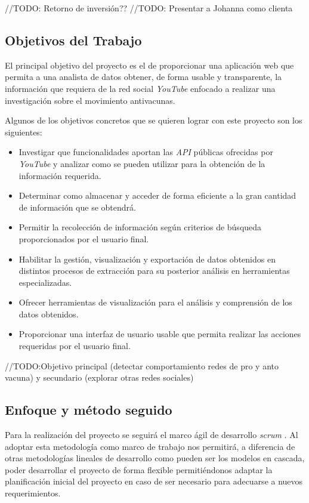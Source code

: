 \documentclass[11pt,a4paper]{article}
\begin{document}
//TODO: Retorno de inversión??
//TODO: Presentar a Johanna como clienta

\subsection{Objetivos del Trabajo}
El principal objetivo del proyecto es el de proporcionar una aplicación web que permita a una analista de datos obtener, de forma usable y transparente, la información que requiera de la red social \textit{YouTube} enfocado a realizar una investigación sobre el movimiento antivacunas.

Algunos de los objetivos concretos que se quieren lograr con este proyecto son los siguientes: 

\begin{itemize}
\item Investigar que funcionalidades aportan las \textit{API} públicas ofrecidas por \textit{YouTube} y analizar como se pueden utilizar para la obtención de la información requerida.
\item Determinar como almacenar y acceder de forma eficiente a la gran cantidad de información que se obtendrá.
\item Permitir la recolección de información según criterios de búsqueda proporcionados por el usuario final.
\item Habilitar la gestión, visualización y exportación de datos obtenidos en distintos procesos de extracción para su posterior análisis en herramientas especializadas.
\item Ofrecer herramientas de visualización para el análisis y comprensión de los datos obtenidos.
\item Proporcionar una interfaz de usuario usable que permita realizar las acciones requeridas por el usuario final.
\end{itemize}

//TODO:Objetivo principal (detectar comportamiento redes de pro y anto vacuna) y secundario (explorar otras redes sociales)

\subsection{Enfoque y método seguido}
Para la realización del proyecto se seguirá el marco ágil de desarrollo \textit{scrum} \cite{8}. Al adoptar esta metodología como marco de trabajo nos permitirá, a diferencia de otras metodologías lineales de desarrollo como pueden ser los modelos en cascada, poder desarrollar el proyecto de forma flexible permitiéndonos adaptar la planificación inicial del proyecto en caso de ser necesario para adecuarse a nuevos requerimientos.
\end{document}

